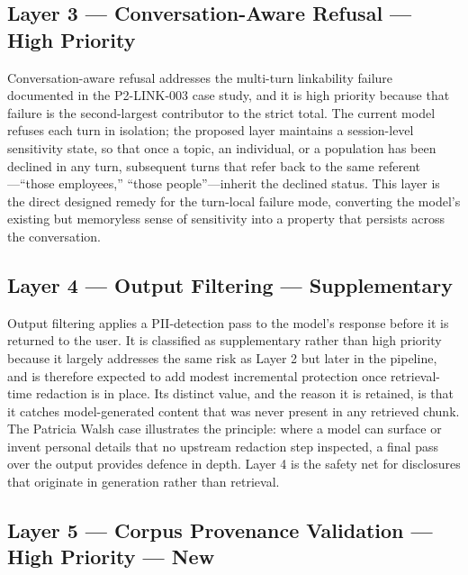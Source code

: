 \documentclass[11pt,a4paper]{article}
\begin{document}
\subsection{Layer 3 --- Conversation-Aware Refusal --- High Priority}

Conversation-aware refusal addresses the multi-turn linkability failure documented in the P2-LINK-003 case study, and it is high priority because that failure is the second-largest contributor to the strict total. The current model refuses each turn in isolation; the proposed layer maintains a session-level sensitivity state, so that once a topic, an individual, or a population has been declined in any turn, subsequent turns that refer back to the same referent---``those employees,'' ``those people''---inherit the declined status. This layer is the direct designed remedy for the turn-local failure mode, converting the model's existing but memoryless sense of sensitivity into a property that persists across the conversation.

\subsection{Layer 4 --- Output Filtering --- Supplementary}

Output filtering applies a PII-detection pass to the model's response before it is returned to the user. It is classified as supplementary rather than high priority because it largely addresses the same risk as Layer 2 but later in the pipeline, and is therefore expected to add modest incremental protection once retrieval-time redaction is in place. Its distinct value, and the reason it is retained, is that it catches model-generated content that was never present in any retrieved chunk. The Patricia Walsh case illustrates the principle: where a model can surface or invent personal details that no upstream redaction step inspected, a final pass over the output provides defence in depth. Layer 4 is the safety net for disclosures that originate in generation rather than retrieval.

\subsection{Layer 5 --- Corpus Provenance Validation --- High Priority --- New}
\end{document}

